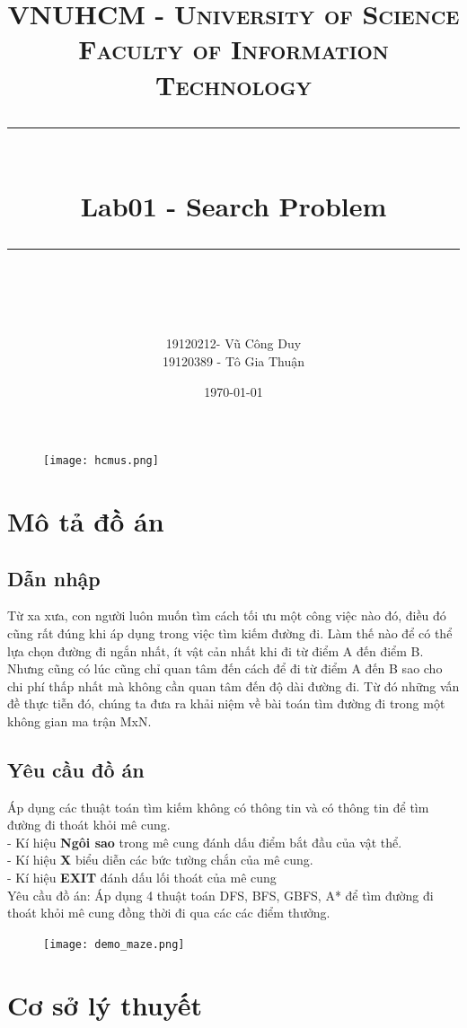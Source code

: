 \documentclass[11pt]{scrartcl} %
\title{	
	\normalfont\normalsize
	\textsc{VNUHCM - University of Science \\Faculty of Information Technology}\\ %
	\vspace{25pt} %
	\rule{\linewidth}{0.5pt}\\ %
	\vspace{20pt} %
	{\huge Lab01 - Search Problem}\\ %
	\vspace{12pt} %
	\rule{\linewidth}{2pt}\\ %
	\vspace{12pt} %
}
\author{\LARGE 19120212- Vũ Công Duy \\ \LARGE 19120389 - Tô Gia Thuận}
\date{\normalsize\today} %
\begin{document}
\maketitle 
\begin{figure}[h] %
	\centering
	\texttt{[image: hcmus.png]} %
\end{figure}

\newpage
\section{Mô tả đồ án}
\subsection{Dẫn nhập}
Từ xa xưa, con người luôn muốn tìm cách tối ưu một công việc nào đó, điều đó cũng rất đúng khi áp dụng trong việc tìm kiếm đường đi. Làm thế nào để có thể lựa chọn đường đi ngắn nhất, ít vật cản nhất khi đi từ điểm A đến điểm B. Nhưng cũng có lúc cũng chỉ quan tâm đến cách để đi từ điểm A đến B sao cho chi phí thấp nhất mà không cần quan tâm đến độ dài đường đi. Từ đó những vấn đề thực tiễn đó, chúng ta đưa ra khải niệm về bài toán tìm đường đi trong một không gian ma trận MxN.
\subsection{Yêu cầu đồ án}
 Áp dụng các thuật toán tìm kiếm không có thông tin và có thông tin để tìm đường đi thoát khỏi mê cung. 
\\- Kí hiệu \textbf{Ngôi sao} trong mê cung đánh dấu điểm bắt đầu của vật thể. 
\\- Kí hiệu \textbf{X} biểu diễn các bức tường chắn của mê cung.
\\- Kí hiệu \textbf{EXIT} đánh dấu lối thoát của mê cung
\\Yêu cầu đồ án: Áp dụng 4 thuật toán DFS, BFS, GBFS, A* để tìm đường đi thoát khỏi mê cung đồng thời đi qua các các điểm thưởng.
\begin{figure}[h] %
	\centering
	\texttt{[image: demo\_maze.png]} %
\end{figure}

\section{Cơ sở lý thuyết}
\end{document}
